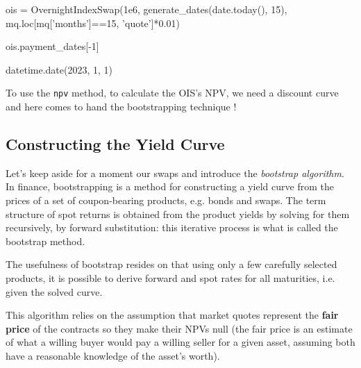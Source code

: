 \begin{ipython}
ois = OvernightIndexSwap(1e6,
                         generate_dates(date.today(), 15),
                         mq.loc[mq['months']==15, 'quote']*0.01)

ois.payment_dates[-1]
\end{ipython}
\begin{ioutput}
datetime.date(2023, 1, 1)
\end{ioutput}

To use the \texttt{npv} method, to calculate the OIS's NPV, we need a discount curve and here comes to hand the bootstrapping technique !

\subsection{Constructing the Yield Curve}
\label{the-bootstrapping-technique}

Let's keep aside for a moment our swaps and introduce the \emph{bootstrap algorithm}. In finance, bootstrapping is a method for constructing a yield curve from the prices of a set of coupon-bearing products, e.g. bonds and swaps. The term structure of spot returns is obtained from the product yields by solving for them recursively, by forward substitution: this iterative process is what is called the bootstrap method. 

The usefulness of bootstrap resides on that using only a few carefully selected products, it is possible to derive forward and spot rates for all maturities, i.e. given the solved curve.

This algorithm relies on the assumption that market quotes represent the \textbf{fair price} of the contracts so they make their NPVs null (the fair price is an estimate of what a willing buyer would pay a willing seller for a given asset, assuming both have a reasonable knowledge of the asset's worth).

